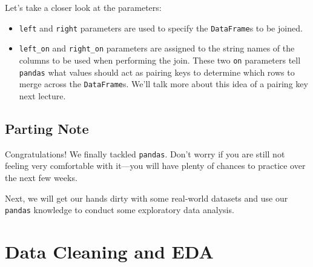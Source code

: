 \documentclass[
  letterpaper,
  DIV=11,
  numbers=noendperiod]{scrreprt}
\providecommand{\tightlist}{%
  \setlength{\itemsep}{0pt}\setlength{\parskip}{0pt}}\usepackage{longtable,booktabs,array}
\begin{document}
Let's take a closer look at the parameters:

\begin{itemize}
\tightlist
\item
  \texttt{left} and \texttt{right} parameters are used to specify the
  \texttt{DataFrame}s to be joined.
\item
  \texttt{left\_on} and \texttt{right\_on} parameters are assigned to
  the string names of the columns to be used when performing the join.
  These two \texttt{on} parameters tell \texttt{pandas} what values
  should act as pairing keys to determine which rows to merge across the
  \texttt{DataFrame}s. We'll talk more about this idea of a pairing key
  next lecture.
\end{itemize}

\section{Parting Note}\label{parting-note-2}

Congratulations! We finally tackled \texttt{pandas}. Don't worry if you
are still not feeling very comfortable with it---you will have plenty of
chances to practice over the next few weeks.

Next, we will get our hands dirty with some real-world datasets and use
our \texttt{pandas} knowledge to conduct some exploratory data analysis.


\chapter{Data Cleaning and EDA}\label{data-cleaning-and-eda}
\end{document}
